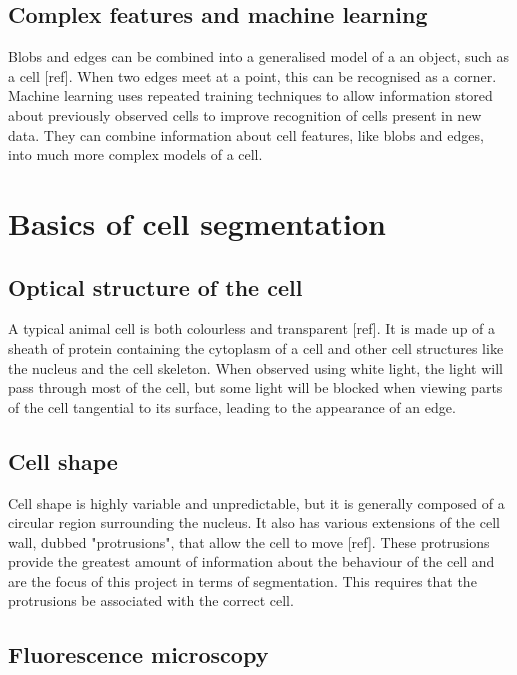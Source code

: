 \subsection{Complex features and machine learning}

Blobs and edges can be combined into a generalised model of a an object, such as a cell [ref]. When two edges meet at a point, this can be recognised as a corner. Machine learning uses repeated training techniques to allow information stored about previously observed cells to improve recognition of cells present in new data. They can combine information about cell features, like blobs and edges, into much more complex models of a cell.

\section{Basics of cell segmentation}

\subsection{Optical structure of the cell}

A typical animal cell is both colourless and transparent [ref]. It is made up of a sheath of protein containing the cytoplasm of a cell and other cell structures like the nucleus and the cell skeleton. When observed using white light, the light will pass through most of the cell, but some light will be blocked when viewing parts of the cell tangential to its surface, leading to the appearance of an edge.

\subsection{Cell shape}

Cell shape is highly variable and unpredictable, but it is generally composed of a circular region surrounding the nucleus. It also has various extensions of the cell wall, dubbed "protrusions", that allow the cell to move [ref]. These protrusions provide the greatest amount of information about the behaviour of the cell and are the focus of this project in terms of segmentation. This requires that the protrusions be associated with the correct cell.

\subsection{Fluorescence microscopy}

